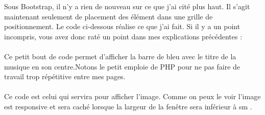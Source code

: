 \documentclass{article}
\begin{document}
Sous Bootstrap, il n'y a rien de nouveau sur ce que j'ai cit\'e plus haut. Il s'agit maintenant seulement de placement des \'el\'ement dans une grille de positionnement. Le code ci-dessous r\'ealise ce que j'ai fait. Si il y a un point incompris, vous avez donc rat\'e un point dans mes explications pr\'ec\'edentes :
\vspace{0.5cm}\\
\vspace{0.5cm}\\
Ce petit bout de code permet d'afficher la barre de bleu avec le titre de la musique en son centre.Notons le petit emploie de PHP pour ne pas faire de travail trop r\'ep\'etitive entre mes pages.
\vspace{0.5cm}\\
\vspace{0.5cm}\\
Ce code est celui qui servira pour afficher l'image. Comme on peux le voir l'image est responsive et sera cach\'e lorsque la largeur de la fen\^etre sera inf\'erieur \`a \og sm \fg{}.
\vspace{0.5cm}\\
\end{document}
